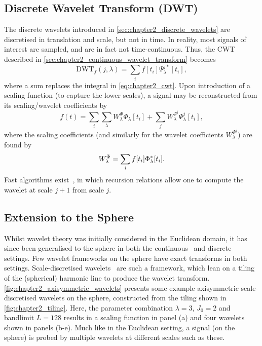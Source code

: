 \subsection{Discrete Wavelet Transform (DWT)}

The discrete wavelets introduced in \cref{sec:chapter2_discrete_wavelets} are discretised in translation and scale, but not in time.
In reality, most signals of interest are sampled, and are in fact not time-continuous.
Thus, the CWT described in \cref{sec:chapter2_continuous_wavelet_transform} becomes
%
\begin{equation}
	\text{DWT}_{f}(j,\lambda)
	= \sum\limits_{i} f[t_{i}] \Psi^{j\ast}_{\lambda}[t_{i}],
\end{equation}
%
where a sum replaces the integral in \cref{eq:chapter2_cwt}.
Upon introduction of a scaling function (to capture the lower scales), a signal may be reconstructed from its scaling/wavelet coefficients by
%
\begin{equation}
	f(t)
	= \sum\limits_{i} \sum\limits_{\lambda} W^{\Phi}_{\lambda} \Phi_{\lambda}[t_{i}]
	+ \sum\limits_{j} W^{\Psi^{j}}_{\lambda} \Psi^{j}_{\lambda}[t_{i}],
\end{equation}
%
where the scaling coefficients (and similarly for the wavelet coefficients \(W^{\Psi^{j}}_{\lambda}\)) are found by
%
\begin{equation}
	W^{\Phi}_{\lambda}
	= \sum\limits_{i} f[t_{i}] \Phi^{\ast}_{\lambda}[t_{i}].
\end{equation}
%
Fast algorithms exist~\cite{Beylkin1991,Rioul1992}, in which recursion relations allow one to compute the wavelet at scale \(j+1\) from scale \(j\).

\subsection{Extension to the Sphere}

Whilst wavelet theory was initially considered in the Euclidean domain, it has since been generalised to the sphere in both the continuous~\cite{Torresani1995,Holschneider1996,Freeden1997,Antoine1998,Antoine1999,Antoine2002,Demanet2003,Wiaux2005,Sanz2006,McEwen2006} and discrete~\cite{Sweldens1996,Schroder2000,Wiaux2005,Starck2006,Wiaux2008,Starck2009,Leistedt2013,McEwen2019,McEwen2018} settings.
Few wavelet frameworks on the sphere have exact transforms in both settings.
Scale-discretised wavelets~\cite{Wiaux2008,McEwen2018,Leistedt2013,McEwen2013,McEwen2015} are such a framework, which lean on a tiling of the (spherical) harmonic line to produce the wavelet transform.
\cref{fig:chapter2_axisymmetric_wavelets} presents some example axisymmetric scale-discretised wavelets on the sphere, constructed from the tiling shown in \cref{fig:chapter2_tiling}.
Here, the parameter combination \(\lambda=3\), \(J_{0}=2\) and bandlimit \(L=128\) results in a scaling function in panel (a) and four wavelets shown in panels (b-e).
Much like in the Euclidean setting, a signal (on the sphere) is probed by multiple wavelets at different scales such as these.

